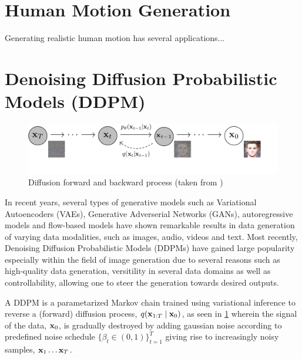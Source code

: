 \section{Human Motion Generation}
Generating realistic human motion has several applications...

\section{Denoising Diffusion Probabilistic Models (DDPM)}
\begin{figure}[H]
    \centering
    \includegraphics[width=\linewidth]{figures/pgm_diagram_xarrow_small.pdf}
    \caption{Diffusion forward and backward process (taken from \cite{ho2020denoising})}
    \label{fig:diffusion-process}
\end{figure}
In recent years, several types of generative models such as Variational Autoencoders (VAEs), Generative Adverserial Networks (GANs), autoregressive models and flow-based models have shown remarkable results in data generation of varying data modalities, such as images, audio, videos and text. Most recently, Denoising Diffusion Probabilistic Models (DDPMs) have gained large popularity especially within the field of image generation due to several reasons such as high-quality data generation, versitility in several data domains as well as controllability, allowing one to steer the generation towards desired outputs.

A DDPM is a parametarized Markov chain trained using variational inference to reverse a (forward) diffusion process, $q(\boldsymbol{\mathbf{x}}_{1:T} \mid \boldsymbol{\mathbf{x}}_0)$, as seen in \cref{fig:diffusion-process} wherein the signal of the data, $\boldsymbol{\mathbf{x}}_0$, is gradually destroyed by adding gaussian noise according to predefined noise schedule $\{\beta_t  \in (0,1) \}_{t=1}^T$ giving rise to increasingly noisy samples, $\boldsymbol{\mathbf{x}}_1 \ldots \boldsymbol{\mathbf{x}}_T$. 

